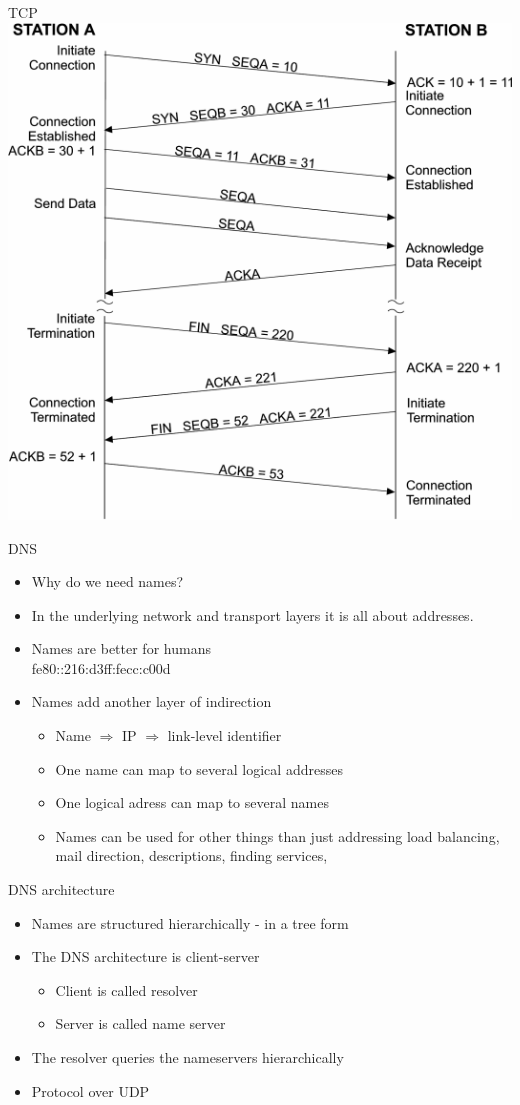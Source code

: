 \documentclass{beamer}
\begin{document}
\begin{frame}{TCP}
    \includegraphics[width=0.7\linewidth]{connections}
\end{frame}

\begin{frame}{DNS}
\begin{itemize}
  \item Why do we need names?
  \item In the underlying network and transport layers it is all about
addresses.
\item Names are better for humans\\
fe80::216:d3ff:fecc:c00d
\item Names add another layer of indirection
\begin{itemize}
\item Name $\Rightarrow$ IP $\Rightarrow$ link-level identifier
\item One name can map to several logical addresses
\item One logical adress can map to several names
\item Names can be used for other things than just addressing
  load balancing, mail direction, descriptions, finding services,
\end{itemize}
\end{itemize}
\end{frame}

\begin{frame}{DNS architecture}
\begin{itemize}
  \item Names are structured hierarchically - in a tree form
  \item The DNS architecture is client-server
\begin{itemize}
\item Client is called resolver
\item Server is called name server
\end{itemize}
\item The resolver queries the nameservers hierarchically
\item Protocol over UDP
\end{itemize}
\end{frame}
\end{document}
